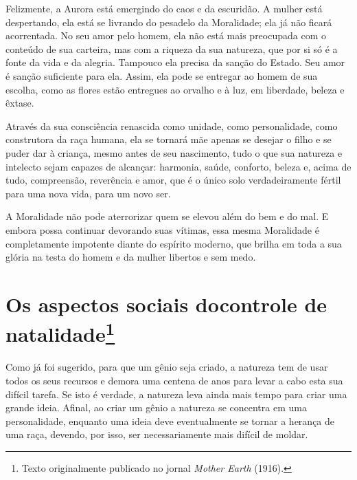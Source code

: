Felizmente, a Aurora está emergindo do caos e da escuridão. A mulher
está despertando, ela está se livrando do pesadelo da Moralidade; ela já
não ficará acorrentada. No seu amor pelo homem, ela não está mais
preocupada com o conteúdo de sua carteira, mas com a riqueza da sua
natureza, que por si só é a fonte da vida e da alegria. Tampouco ela
precisa da sanção do Estado. Seu amor é sanção suficiente para ela.
Assim, ela pode se entregar ao homem de sua escolha, como as flores
estão entregues ao orvalho e à luz, em liberdade, beleza e êxtase.

Através da sua consciência renascida como unidade, como personalidade,
como construtora da raça humana, ela se tornará mãe apenas se desejar o
filho e se puder dar à criança, mesmo antes de seu nascimento, tudo o
que sua natureza e intelecto sejam capazes de alcançar: harmonia, saúde,
conforto, beleza e, acima de tudo, compreensão, reverência e amor, que é
o único solo verdadeiramente fértil para uma nova vida, para um novo
ser.

A Moralidade não pode aterrorizar quem se elevou além do bem e do mal. E
embora possa continuar devorando suas vítimas, essa mesma Moralidade é
completamente impotente diante do espírito moderno, que brilha em toda a
sua glória na testa do homem e da mulher libertos e sem medo.

\chapter[Os aspectos sociais do controle de natalidade]{Os aspectos sociais do\break controle de natalidade\footnote[*]{Texto
  originalmente publicado no jornal \emph{Mother Earth} (1916).}}

Como já foi sugerido, para que um gênio seja criado, a natureza tem de
usar todos os seus recursos e demora uma centena de anos para levar a
cabo esta sua difícil tarefa. Se isto é verdade, a natureza leva ainda
mais tempo para criar uma grande ideia. Afinal, ao criar um gênio a
natureza se concentra em uma personalidade, enquanto uma ideia deve
eventualmente se tornar a herança de uma raça, devendo, por isso, ser
necessariamente mais difícil de moldar.

